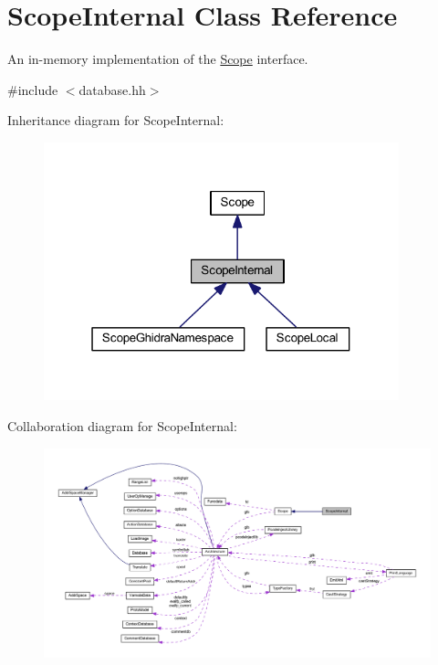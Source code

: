 \hypertarget{class_scope_internal}{}\section{Scope\+Internal Class Reference}
\label{class_scope_internal}


An in-\/memory implementation of the \mbox{\hyperlink{class_scope}{Scope}} interface.  




{\ttfamily \#include $<$database.\+hh$>$}



Inheritance diagram for Scope\+Internal\+:
\nopagebreak
\begin{figure}[H]
\begin{center}
\leavevmode
\includegraphics[width=292pt]{class_scope_internal__inherit__graph}
\end{center}
\end{figure}


Collaboration diagram for Scope\+Internal\+:
\nopagebreak
\begin{figure}[H]
\begin{center}
\leavevmode
\includegraphics[width=350pt]{class_scope_internal__coll__graph}
\end{center}
\end{figure}
